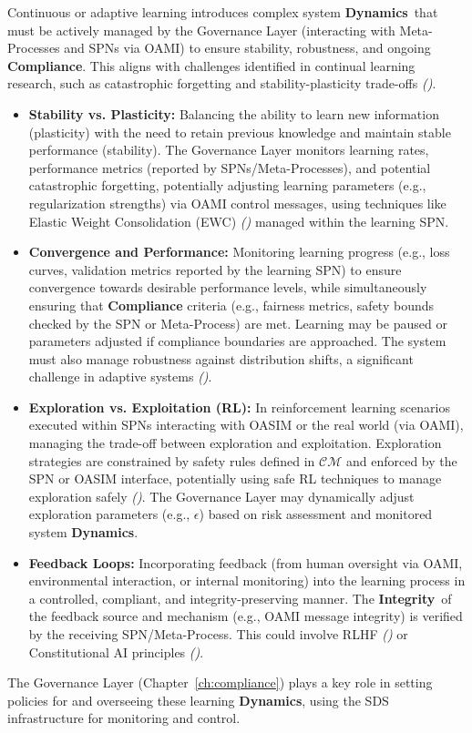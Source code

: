 \documentclass[12pt,a4paper]{report}
\renewcommand{\citep}[1]{\textit{\scriptsize{(\cite{#1})}}}
\newcommand{\Integrity}{\textbf{Integrity}}
\newcommand{\Dynamics}{\textbf{Dynamics}}
\begin{document}
	Continuous or adaptive learning introduces complex system \Dynamics\ that must be actively managed by the Governance Layer (interacting with Meta-Processes and SPNs via OAMI) to ensure stability, robustness, and ongoing \textbf{Compliance}. This aligns with challenges identified in continual learning research, such as catastrophic forgetting and stability-plasticity trade-offs \citep{Wang2024ContinualLearningSurvey}.
	\begin{itemize}
		\item \textbf{Stability vs. Plasticity:} Balancing the ability to learn new information (plasticity) with the need to retain previous knowledge and maintain stable performance (stability). The Governance Layer monitors learning rates, performance metrics (reported by SPNs/Meta-Processes), and potential catastrophic forgetting, potentially adjusting learning parameters (e.g., regularization strengths) via OAMI control messages, using techniques like Elastic Weight Consolidation (EWC) \citep{Kirkpatrick2017OvercomingCF} managed within the learning SPN.
		\item \textbf{Convergence and Performance:} Monitoring learning progress (e.g., loss curves, validation metrics reported by the learning SPN) to ensure convergence towards desirable performance levels, while simultaneously ensuring that \textbf{Compliance} criteria (e.g., fairness metrics, safety bounds checked by the SPN or Meta-Process) are met. Learning may be paused or parameters adjusted if compliance boundaries are approached. The system must also manage robustness against distribution shifts, a significant challenge in adaptive systems \citep{DataDistributionShifts2022, AdditionalCitationRef53}.
		\item \textbf{Exploration vs. Exploitation (RL):} In reinforcement learning scenarios executed within SPNs interacting with OASIM or the real world (via OAMI), managing the trade-off between exploration and exploitation. Exploration strategies are constrained by safety rules defined in $\mathcal{CM}$ and enforced by the SPN or OASIM interface, potentially using safe RL techniques to manage exploration safely \citep{Constraint_RL_Survey_2024, Cao_PhyDRL_2024, AdditionalCitationRef16}. The Governance Layer may dynamically adjust exploration parameters (e.g., $\epsilon$) based on risk assessment and monitored system \Dynamics.
		\item \textbf{Feedback Loops:} Incorporating feedback (from human oversight via OAMI, environmental interaction, or internal monitoring) into the learning process in a controlled, compliant, and integrity-preserving manner. The \Integrity\ of the feedback source and mechanism (e.g., OAMI message integrity) is verified by the receiving SPN/Meta-Process. This could involve RLHF \citep{Dai_Safe_RLHF_2023} or Constitutional AI principles \citep{Bai2022ConstitutionalAI}.
	\end{itemize}
	The Governance Layer (Chapter~\ref{ch:compliance}) plays a key role in setting policies for and overseeing these learning \Dynamics, using the SDS infrastructure for monitoring and control.
	
\end{document}
